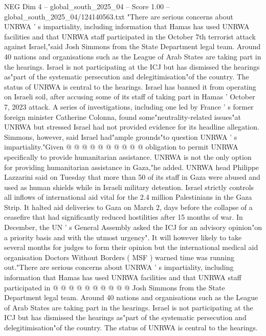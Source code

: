 \begin{textsample}{NEG Dim 4 – global\_south\_2025\_04 – Score 1.00 – global\_south\_2025\_04/124140563.txt}  \label{ex:f4_neg_215}
"There are serious concerns about UNRWA ' s impartiality, including information that Hamas has used UNRWA facilities and that UNRWA staff participated in the October 7th terrorist attack against Israel,"said Josh Simmons from the State Department legal team.
Around 40 nations and organisations such as the League of Arab States are taking part in the hearings.
Israel is not participating at the ICJ but has dismissed the hearings as"part of the systematic persecution and delegitimisation"of the country.
The status of UNRWA is central to the hearings.
Israel has banned it from operating on Israeli soil, after accusing some of its staff of taking part in Hamas ' October 7, 2023 attack.
A series of investigations, including one led by France ' s former foreign minister Catherine Colonna, found some"neutrality-related issues"at UNRWA but stressed Israel had not provided evidence for its headline allegation.
Simmons, however, said Israel had"ample grounds"to question UNRWA ' s impartiality."Given @ @ @ @ @ @ @ @ @ @ obligation to permit UNRWA specifically to provide humanitarian assistance.
UNRWA is not the only option for providing humanitarian assistance in Gaza,"he added.
UNRWA head Philippe Lazzarini said on Tuesday that more than 50 of its staff in Gaza were abused and used as human shields while in Israeli military detention.
Israel strictly controls all inflows of international aid vital for the 2.4 million Palestinians in the Gaza Strip.
It halted aid deliveries to Gaza on March 2, days before the collapse of a ceasefire that had significantly reduced hostilities after 15 months of war.
In December, the UN ' s General Assembly asked the ICJ for an advisory opinion"on a priority basis and with the utmost urgency".
It will however likely to take several months for judges to form their opinion but the international medical aid organisation Doctors Without Borders ( MSF ) warned time was running out."There are serious concerns about UNRWA ' s impartiality, including information that Hamas has used UNRWA facilities and that UNRWA staff participated in @ @ @ @ @ @ @ @ @ @ Josh Simmons from the State Department legal team.
Around 40 nations and organisations such as the League of Arab States are taking part in the hearings.
Israel is not participating at the ICJ but has dismissed the hearings as"part of the systematic persecution and delegitimisation"of the country.
The status of UNRWA is central to the hearings.

\end{textsample}
